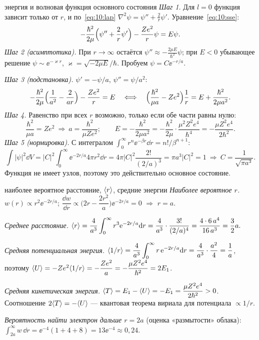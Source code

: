 \begin{derivation}[label=der:10:ground]{энергия и волновая функция основного состояния}
\emph{Шаг 1.} Для $l=0$ функция зависит только от $r$, и по~\eqref{eq:10:lap}
$\nabla^2\psi=\psi''+\frac2r\psi'$. Уравнение~\eqref{eq:10:sse}:
\[
  -\frac{\hbar^2}{2\mu}\Bigl(\psi''+\frac2r\psi'\Bigr)-\frac{Ze^2}{r}\psi=E\psi .
\]
\emph{Шаг 2 (асимптотика).} При $r\to\infty$ остаётся $\psi''\approx-\frac{2\mu E}{\hbar^2}\psi$; при $E<0$
убывающее решение $\psi\sim\ee^{-\varkappa r}$, $\varkappa=\sqrt{-2\mu E}/\hbar$. Пробуем $\psi=C\ee^{-r/a}$.

\emph{Шаг 3 (подстановка).} $\psi'=-\psi/a$, $\psi''=\psi/a^2$:
\[
  -\frac{\hbar^2}{2\mu}\Bigl(\frac{1}{a^2}-\frac{2}{ar}\Bigr)-\frac{Ze^2}{r}=E
  \quad\Longleftrightarrow\quad
  \Bigl(\frac{\hbar^2}{\mu a}-Ze^2\Bigr)\frac1r=E+\frac{\hbar^2}{2\mu a^2}.
\]
\emph{Шаг 4.} Равенство при всех $r$ возможно, только если обе части равны нулю:
\[
  \frac{\hbar^2}{\mu a}=Ze^2\ \Rightarrow\ a=\frac{\hbar^2}{\mu Ze^2};\qquad
  E=-\frac{\hbar^2}{2\mu a^2}=-\frac{\hbar^2}{2\mu}\cdot\frac{\mu^2Z^2e^4}{\hbar^4}=-\frac{\mu Z^2e^4}{2\hbar^2}.
\]
\emph{Шаг 5 (нормировка).} С интегралом $\int_0^\infty r^n\ee^{-\beta r}\dd r=n!/\beta^{n+1}$:
\[
  \int|\psi|^2\dd V=|C|^2\int_0^\infty\ee^{-2r/a}4\pi r^2\dd r=4\pi|C|^2\frac{2!}{(2/a)^3}=\pi a^3|C|^2=1
  \ \Rightarrow\ C=\frac{1}{\sqrt{\pi a^3}}.
\]
Функция не имеет узлов, поэтому это действительно основное состояние.
\end{derivation}

\begin{derivation}[label=der:10:means]{наиболее вероятное расстояние, $\langle r\rangle$, средние энергии}
\emph{Наиболее вероятное $r$.} $w(r)\propto r^2\ee^{-2r/a}$; $\dfrac{\dd w}{\dd r}\propto\bigl(2r-\dfrac{2r^2}{a}\bigr)\ee^{-2r/a}=0$ $\Rightarrow$ $r=a$.

\emph{Среднее расстояние.}
$\langle r\rangle=\dfrac{4}{a^3}\displaystyle\int_0^\infty r^3\mathrm{e}^{-2r/a}\mathrm{d} r=\dfrac{4}{a^3}\cdot\dfrac{3!}{(2/a)^4}=\dfrac{4\cdot6\,a^4}{16\,a^3}=\dfrac32a .$

\emph{Средняя потенциальная энергия.}
$\langle1/r\rangle=\dfrac{4}{a^3}\displaystyle\int_0^\infty r\,\mathrm{e}^{-2r/a}\mathrm{d} r=\dfrac{4}{a^3}\cdot\dfrac{a^2}{4}=\dfrac1a$, поэтому
$\langle U\rangle=-Ze^2\langle1/r\rangle=-\dfrac{Ze^2}{a}=-\dfrac{\mu Z^2e^4}{\hbar^2}=2E_1$.

\emph{Средняя кинетическая энергия.} $\langle T\rangle=E_1-\langle U\rangle=-E_1=\dfrac{\mu Z^2e^4}{2\hbar^2}>0$. Соотношение
$2\langle T\rangle=-\langle U\rangle$ — квантовая теорема вириала для потенциала $\propto1/r$.

\emph{Вероятность найти электрон дальше $r=2a$} (оценка «размытости» облака):
$\int_{2a}^\infty w\,\dd r=\ee^{-4}(1+4+8)=13\ee^{-4}\approx0{,}24$.
\end{derivation}

